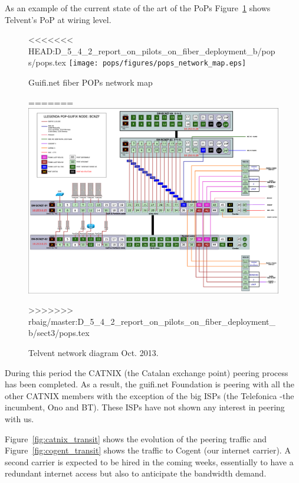 As an example of the current state of the art of the PoPs Figure~\ref{fig:telvent_diagram} shows Telvent's PoP at wiring level.

\begin{figure}[H]
  \centering
<<<<<<< HEAD:D_5_4_2_report_on_pilots_on_fiber_deployment_b/pops/pops.tex
  \texttt{[image: pops/figures/pops\_network\_map.eps]} 
  \caption{Guifi.net fiber POPs network map}
  \label{fig:fibre_map}
=======
  \includegraphics[width=0.95\linewidth]{sect3/figures/telvent_diagram.eps} 
  \caption[Telvent network diagram]{Telvent network diagram Oct. 2013.}
  \label{fig:telvent_diagram}
>>>>>>> rbaig/master:D_5_4_2_report_on_pilots_on_fiber_deployment_b/sect3/pops.tex
\end{figure}


During this period the CATNIX (the Catalan exchange point) peering process has been completed. As a result, the guifi.net Foundation is peering with all the other CATNIX members with the exception of the big ISPs (the Telefonica -the incumbent, Ono and BT). These ISPs have not shown any interest in peering with us.

Figure~\ref{fig:catnix_transit} shows the evolution of the peering traffic and Figure~\ref{fig:cogent_transit} shows the traffic to Cogent (our internet carrier). A second carrier is expected to be hired in the coming weeks, essentially to have a redundant internet access but also to anticipate the bandwidth demand.

